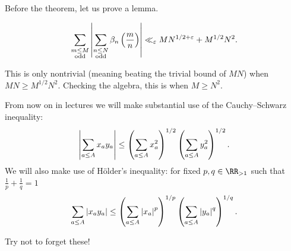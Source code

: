 \documentclass{lecturenotes}
\numberwithin{equation}{section}
\begin{document}
Before the theorem, let us prove a lemma.
\begin{lemma}\label{lem:FILemma}
    \[\sum_{\substack{m\leq M\\\textnormal{odd}}}\left|{\sum_{\substack{n\leq N\\\textnormal{odd}}}\beta_n\left(\frac{m}{n}\right)}\right|\ll_\varepsilon MN^{1/2+\varepsilon}+M^{1/2}N^2.\]
\end{lemma}
\begin{rem}
    This is only nontrivial (meaning beating the trivial bound of $MN$) when $MN\geq M^{1/2}N^2$.  Checking the algebra, this is when $M\geq N^2$.
\end{rem}
\begin{rem}
    From now on in lectures we will make substantial use of the Cauchy--Schwarz inequality:
    \[\left|{\sum_{a\leq A}x_ay_a}\right|\leq \left({\sum_{a\leq A}x_a^2}\right)^{1/2}\left({\sum_{a\leq A}y_a^2}\right)^{1/2}.\]
    We will also make use of H\"older's inequality: for fixed $p,q\in\RR_{>1}$ such that $\tfrac{1}{p}+\tfrac{1}{q}=1$
    \[{\sum_{a\leq A}\left|{x_ay_a}\right|}\leq \left({\sum_{a\leq A}\left|{x_a}\right|^p}\right)^{1/p}\left({\sum_{a\leq A}\left|{y_a}\right|^q}\right)^{1/q}.\]

    Try not to forget these!
\end{rem}
\end{document}
